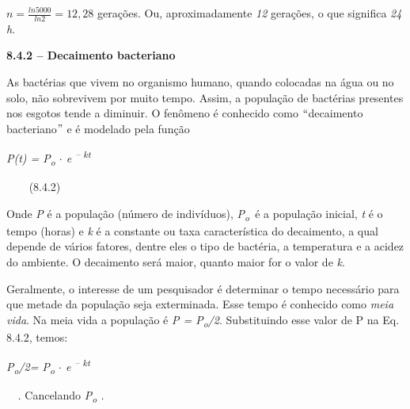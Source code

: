 \documentclass[12pt]{article}
\begin{document}
\vspace{\baselineskip}
 \( n=\frac{ln5000}{ln2}=12,28 \)  gerações. Ou, aproximadamente \textit{12} gerações, o que significa \textit{24 h}.\par

 \par


\vspace{\baselineskip}
{\fontsize{14pt}{16.8pt}\selectfont \textbf{8.4.2 – Decaimento bacteriano}\par}\par


\vspace{\baselineskip}
As bactérias que vivem no organismo humano, quando colocadas na água ou no solo, não sobrevivem por muito tempo. Assim, a população de bactérias presentes nos esgotos tende a diminuir. O fenômeno é conhecido como $``$decaimento bacteriano$"$  e é modelado pela função \par


\vspace{\baselineskip}
\textit{P(t) = P\textsubscript{o} $ \cdot $  e \textsuperscript{– kt}}{\fontsize{14pt}{16.8pt}\selectfont \textit{\ \ \ \  \tab \tab \tab \tab \tab \tab \tab }(8.4.2)\par}\par


\vspace{\baselineskip}
Onde \textit{P} é a população (número de indivíduos), \textit{P\textsubscript{o}\  }é a população inicial, \textit{t} é o tempo (horas) e \textit{k} é a constante ou taxa característica do decaimento, a qual depende de vários fatores, dentre eles o tipo de bactéria, a temperatura e a acidez do ambiente. O decaimento será maior, quanto maior for o valor de \textit{k}. \par


\vspace{\baselineskip}
Geralmente, o interesse de um pesquisador é determinar o tempo necessário para que metade da população seja exterminada. Esse tempo é conhecido como \textit{meia vida}. Na meia vida a população é \textit{P = P\textsubscript{o}/2}. Substituindo esse valor de P na Eq. 8.4.2, temos:\par


\vspace{\baselineskip}
\textit{ P\textsubscript{o}/2= P\textsubscript{o} $ \cdot $  e \textsuperscript{– kt}}{\fontsize{14pt}{16.8pt}\selectfont \textit{\  \  . }Cancelando\textit{ P\textsubscript{o} .}\par}\par
\end{document}

